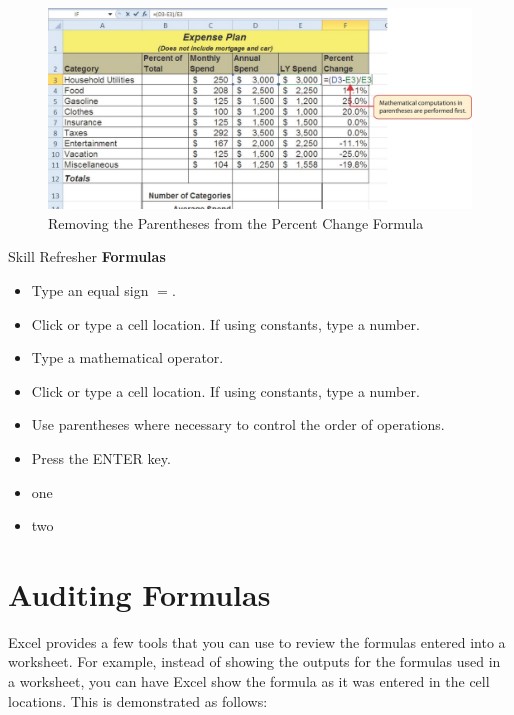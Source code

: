 \begin{figure}[H]
	\centering
	\includegraphics[width=\maxwidth{.95\linewidth}]{gfx/ch02_fig07}
	\caption{Removing the Parentheses from the Percent Change Formula}
	\label{02:fig07}
\end{figure}

\begin{center}
	\begin{sklbox}{Skill Refresher}
		\textbf{Formulas}
		\\
		\begin{itemize}
			\setlength{\itemsep}{0pt}
			\setlength{\parskip}{0pt}
			\setlength{\parsep}{0pt}
			
			\item Type an equal sign $ = $.
			\item Click or type a cell location. If using constants, type a number.
			\item Type a mathematical operator.
			\item Click or type a cell location. If using constants, type a number.
			\item Use parentheses where necessary to control the order of operations.
			\item Press the ENTER key.

			\item one
			\item two
			
		\end{itemize}
	\end{sklbox}
\end{center}

\section{Auditing Formulas}

Excel provides a few tools that you can use to review the formulas entered into a worksheet. For
example, instead of showing the outputs for the formulas used in a worksheet, you can have Excel
show the formula as it was entered in the cell locations. This is demonstrated as follows:

